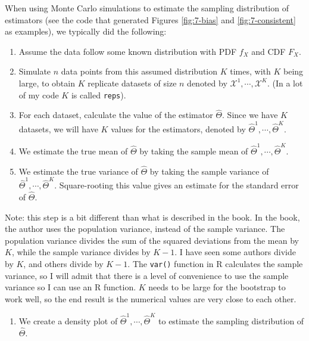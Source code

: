 \documentclass[
]{book}
\providecommand{\tightlist}{%
  \setlength{\itemsep}{0pt}\setlength{\parskip}{0pt}}
\begin{document}
When using Monte Carlo simulations to estimate the sampling distribution of estimators (see the code that generated Figures \ref{fig:7-bias} and \ref{fig:7-consistent} as examples), we typically did the following:

\begin{enumerate}
\def\labelenumi{\arabic{enumi}.}
\item
  Assume the data follow some known distribution with PDF \(f_X\) and CDF \(F_X\).
\item
  Simulate \(n\) data points from this assumed distribution \(K\) times, with \(K\) being large, to obtain \(K\) replicate datasets of size \(n\) denoted by \(\mathcal{X}^{1}, \cdots, \mathcal{X}^{K}\). (In a lot of my code \(K\) is called \texttt{reps}).
\item
  For each dataset, calculate the value of the estimator \(\hat{\Theta}\). Since we have \(K\) datasets, we will have \(K\) values for the estimators, denoted by \(\hat{\Theta}^{1}, \cdots, \hat{\Theta}^{K}\).
\item
  We estimate the true mean of \(\hat{\Theta}\) by taking the sample mean of \(\hat{\Theta}^{1}, \cdots, \hat{\Theta}^{K}\).
\item
  We estimate the true variance of \(\hat{\Theta}\) by taking the sample variance of \(\hat{\Theta}^{1}, \cdots, \hat{\Theta}^{K}\). Square-rooting this value gives an estimate for the standard error of \(\hat{\Theta}\).
\end{enumerate}

Note: this step is a bit different than what is described in the book. In the book, the author uses the population variance, instead of the sample variance. The population variance divides the sum of the squared deviations from the mean by \(K\), while the sample variance divides by \(K-1\). I have seen some authors divide by \(K\), and others divide by \(K-1\). The \texttt{var()} function in R calculates the sample variance, so I will admit that there is a level of convenience to use the sample variance so I can use an R function. \(K\) needs to be large for the bootstrap to work well, so the end result is the numerical values are very close to each other.

\begin{enumerate}
\def\labelenumi{\arabic{enumi}.}
\setcounter{enumi}{5}
\tightlist
\item
  We create a density plot of \(\hat{\Theta}^{1}, \cdots, \hat{\Theta}^{K}\) to estimate the sampling distribution of \(\hat{\Theta}\).
\end{enumerate}
\end{document}
